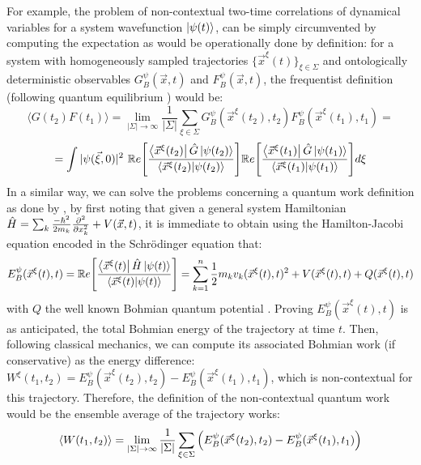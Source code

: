 \documentclass[11pt, a4paper]{article} %
\begin{document}
For example, the problem of non-contextual two-time correlations of dynamical variables for a system wavefunction $\ket{\psi(t)}$, can be simply circumvented by computing the expectation as would be operationally done by definition: for a system with homogeneously sampled trajectories $\{\vec{x}^\xi(t)\}_{\xi\in \Sigma}$ and ontologically deterministic observables $G_B^\psi(\vec{x},t)$ and $F_B^\psi(\vec{x},t)$, the frequentist definition (following quantum equilibrium \cite{Absolute}) would be:
\begin{equation}
\langle G(t_2)F(t_1)\rangle = \lim_{|\Sigma|\rightarrow \infty}\frac{1}{|\Sigma|} \sum_{\xi\in\Sigma} G_B^\psi(\vec{x}^\xi(t_2),t_2)F_B^\psi(\vec{x}^\xi(t_1),t_1) =
\end{equation}
$$
=  \int |\psi(\vec{\xi},0)|^2\ \mathbb{R}e\qty[ \frac{\bra{\vec{x}^\xi(t_2)}\hat{G}\ket{\psi(t_2)}}{\bra{\vec{x}^\xi(t_2)}\ket{\psi(t_2)}} ] \mathbb{R}e\qty[ \frac{\bra{\vec{x}^\xi(t_1)}\hat{G}\ket{\psi(t_1)}}{\bra{\vec{x}^\xi(t_1)}\ket{\psi(t_1)}} ]d\xi
$$
In a similar way, we can solve the problems concerning a quantum work definition as done by \cite{work1, work2}, by first noting that given a general system Hamiltonian $\hat{H}=\sum_k \frac{-\hbar^2}{2m_k}\pdv[2]{}{x_k}+V(\vec{x},t)$, it is immediate to obtain using the Hamilton-Jacobi equation encoded in the Schrödinger equation that:
\begin{equation}
E^\psi_B(\vec{x}^\xi(t),t) = \mathbb{R}e\qty[ \frac{\bra{\vec{x}^\xi(t)}\hat{H}\ket{\psi(t)}}{\bra{\vec{x}^\xi(t)}\ket{\psi(t)}} ] = \sum_{k=1}^n\frac{1}{2}m_kv_k(\vec{x}^\xi(t),t)^2+V(\vec{x}^\xi(t),t)+Q(\vec{x}^\xi(t),t)
\end{equation}
with $Q$ the well known Bohmian quantum potential \cite{Holland, Durr, JordiXavier}. Proving $E^\psi_B(\vec{x}^\xi(t),t)$ is as anticipated, the total Bohmian energy of the trajectory at time $t$. Then, following classical mechanics, we can compute its associated Bohmian work (if conservative) as the energy difference: $W^\xi(t_1,t_2)= E^\psi_B(\vec{x}^\xi(t_2),t_2)-E^\psi_B(\vec{x}^\xi(t_1),t_1)$, which is non-contextual for this trajectory. Therefore, the definition of the non-contextual quantum work would be the ensemble average of the trajectory works:
\begin{equation}
\langle W(t_1,t_2)\rangle = \lim_{|\Sigma|\rightarrow \infty}\frac{1}{|\Sigma|} \sum_{\xi\in\Sigma} \qty(E^\psi_B(\vec{x}^\xi(t_2),t_2)-E^\psi_B(\vec{x}^\xi(t_1),t_1))
\end{equation}
\end{document}
